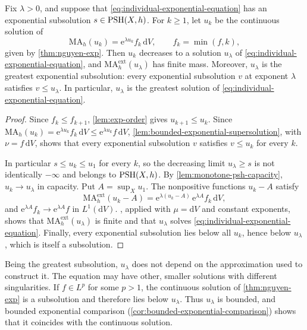 \begin{theorem}\label{thm:individual-exponential-subsolution}
Fix $\lambda>0$, and suppose that \eqref{eq:individual-exponential-equation} has an exponential subsolution $s\in\mathrm{PSH}(X,h)$. For $k\geq1$, let $u_k$ be the continuous solution of
\[
 \mathrm{MA}_h(u_k)=\mathrm{e}^{\lambda u_k}f_k\,\mathrm{d}V,
 \qquad f_k=\min(f,k),
\]
given by \cref{thm:nguyen-exp}. Then $u_k$ decreases to a solution $u_\lambda$ of \eqref{eq:individual-exponential-equation}, and $\mathrm{MA}^{\mathrm{ext}}_h(u_\lambda)$ has finite mass. Moreover, $u_\lambda$ is the greatest exponential subsolution: every exponential subsolution $v$ at exponent $\lambda$ satisfies $v\leq u_\lambda$. In particular, $u_\lambda$ is the greatest solution of \eqref{eq:individual-exponential-equation}.
\end{theorem}
\begin{proof}
Since $f_k\leq f_{k+1}$, \cref{lem:exp-order} gives $u_{k+1}\leq u_k$. Since $\mathrm{MA}_h(u_k)=\mathrm{e}^{\lambda u_k}f_k\,\mathrm{d}V\leq\mathrm{e}^{\lambda u_k}f\,\mathrm{d}V$, \cref{lem:bounded-exponential-supersolution}, with $\nu=f\,\mathrm{d}V$, shows that every exponential subsolution $v$ satisfies $v\leq u_k$ for every $k$.

In particular $s\leq u_k\leq u_1$ for every $k$, so the decreasing limit $u_\lambda\geq s$ is not identically $-\infty$ and belongs to $\mathrm{PSH}(X,h)$. By \cref{lem:monotone-psh-capacity}, $u_k\to u_\lambda$ in capacity. Put $A=\sup_Xu_1$. The nonpositive functions $u_k-A$ satisfy
\[
 \mathrm{MA}^{\mathrm{ext}}_h(u_k-A)=\mathrm{e}^{\lambda(u_k-A)}\,\mathrm{e}^{\lambda A}f_k\,\mathrm{d}V,
\]
and $\mathrm{e}^{\lambda A}f_k\to\mathrm{e}^{\lambda A}f$ in $L^1(\mathrm{d}V)$. , applied with $\mu=\mathrm{d}V$ and constant exponents, shows that $\mathrm{MA}^{\mathrm{ext}}_h(u_\lambda)$ is finite and that $u_\lambda$ solves \eqref{eq:individual-exponential-equation}. Finally, every exponential subsolution lies below all $u_k$, hence below $u_\lambda$, which is itself a subsolution.
\end{proof}

Being the greatest subsolution, $u_\lambda$ does not depend on the approximation used to construct it. The equation may have other, smaller solutions with different singularities. If $f\in L^p$ for some $p>1$, the continuous solution of \cref{thm:nguyen-exp} is a subsolution and therefore lies below $u_\lambda$. Thus $u_\lambda$ is bounded, and bounded exponential comparison (\cref{cor:bounded-exponential-comparison}) shows that it coincides with the continuous solution.

